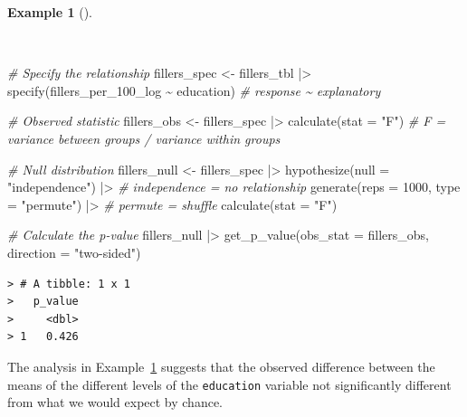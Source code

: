 \documentclass[
  letterpaper,
]{latex/krantz}
\newenvironment{Shaded}{\begin{snugshade}}{\end{snugshade}}
\newcommand{\AttributeTok}[1]{\textcolor[rgb]{0.00,0.00,0.00}{#1}}
\newcommand{\CommentTok}[1]{\textcolor[rgb]{0.00,0.00,0.00}{\textit{#1}}}
\newcommand{\DecValTok}[1]{\textcolor[rgb]{0.00,0.00,0.00}{#1}}
\newcommand{\FunctionTok}[1]{\textcolor[rgb]{0.00,0.00,0.00}{#1}}
\newcommand{\NormalTok}[1]{\textcolor[rgb]{0.00,0.00,0.00}{#1}}
\newcommand{\OtherTok}[1]{\textcolor[rgb]{0.00,0.00,0.00}{#1}}
\newcommand{\SpecialCharTok}[1]{\textcolor[rgb]{0.00,0.00,0.00}{#1}}
\newcommand{\StringTok}[1]{\textcolor[rgb]{0.00,0.00,0.00}{#1}}
\theoremstyle{definition}
\newtheorem{example}{Example}[chapter]
\theoremstyle{remark}
\begin{document}
\begin{example}[]\protect\hypertarget{exm-ida-num-bi-edu}{}\label{exm-ida-num-bi-edu}

~

\begin{Shaded}
\begin{Highlighting}[]
\CommentTok{\# Specify the relationship}
\NormalTok{fillers\_spec }\OtherTok{\textless{}{-}}
\NormalTok{  fillers\_tbl }\SpecialCharTok{|\textgreater{}}
  \FunctionTok{specify}\NormalTok{(fillers\_per\_100\_log }\SpecialCharTok{\textasciitilde{}}\NormalTok{ education) }\CommentTok{\# response \textasciitilde{} explanatory}

\CommentTok{\# Observed statistic}
\NormalTok{fillers\_obs }\OtherTok{\textless{}{-}}
\NormalTok{  fillers\_spec }\SpecialCharTok{|\textgreater{}}
  \FunctionTok{calculate}\NormalTok{(}\AttributeTok{stat =} \StringTok{"F"}\NormalTok{) }\CommentTok{\# F = variance between groups / variance within groups}

\CommentTok{\# Null distribution}
\NormalTok{fillers\_null }\OtherTok{\textless{}{-}}
\NormalTok{  fillers\_spec }\SpecialCharTok{|\textgreater{}}
  \FunctionTok{hypothesize}\NormalTok{(}\AttributeTok{null =} \StringTok{"independence"}\NormalTok{) }\SpecialCharTok{|\textgreater{}} \CommentTok{\# independence = no relationship}
  \FunctionTok{generate}\NormalTok{(}\AttributeTok{reps =} \DecValTok{1000}\NormalTok{, }\AttributeTok{type =} \StringTok{"permute"}\NormalTok{) }\SpecialCharTok{|\textgreater{}} \CommentTok{\# permute = shuffle}
  \FunctionTok{calculate}\NormalTok{(}\AttributeTok{stat =} \StringTok{"F"}\NormalTok{)}

\CommentTok{\# Calculate the p{-}value}
\NormalTok{fillers\_null }\SpecialCharTok{|\textgreater{}}
  \FunctionTok{get\_p\_value}\NormalTok{(}\AttributeTok{obs\_stat =}\NormalTok{ fillers\_obs, }\AttributeTok{direction =} \StringTok{"two{-}sided"}\NormalTok{)}
\end{Highlighting}
\end{Shaded}

\begin{verbatim}
> # A tibble: 1 x 1
>   p_value
>     <dbl>
> 1   0.426
\end{verbatim}

\end{example}

The analysis in Example~\ref{exm-ida-num-bi-edu} suggests that the
observed difference between the means of the different levels of the
\texttt{education} variable not significantly different from what we
would expect by chance.
\end{document}

